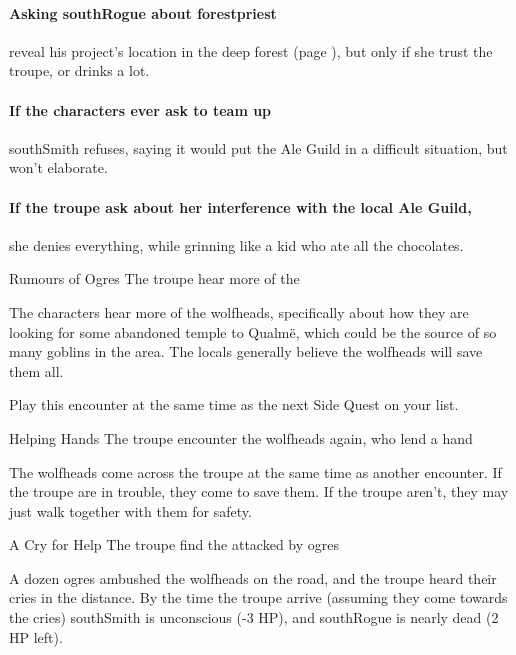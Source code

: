 \southRogue
\label{courtbile}

\paragraph{Asking \gls{southRogue} about \gls{forestpriest}}
reveal his project's location in the deep forest (page \pageref{lostcity}), but only if she trust the troupe, or drinks a lot.

\southSmith

\paragraph{If the characters ever ask to team up}
\gls{southSmith} refuses, saying it would put the Ale Guild in a difficult situation, but won't elaborate.

\southSeeker

\beardedalemaster
\label{beardedalemaster}

\paragraph{If the troupe ask about her interference with the local Ale Guild,}
she denies everything, while grinning like a kid who ate all the chocolates.

{\squash Rumours of Ogres}%
{The troupe hear more of the }%

The characters hear more of the \glspl{wolfhead}, specifically about how they are looking for some abandoned temple to Qualm\"e, which could be the source of so many goblins in the area.
The locals generally believe the \glspl{wolfhead} will save them all.

Play this encounter at the same time as the next Side Quest on your list.

{\squash Helping Hands}%
{The troupe encounter the \glspl{wolfhead} again, who lend a hand}%

The \glspl{wolfhead} come across the troupe at the same time as another encounter.
If the troupe are in trouble, they come to save them.
If the troupe aren't, they may just walk together with them for safety.

{A Cry for Help}%
{The troupe find the  attacked by ogres}%

A dozen ogres ambushed the \glspl{wolfhead} on the road, and the troupe heard their cries in the distance.
By the time the troupe arrive (assuming they come towards the cries) \gls{southSmith} is unconscious (-3 HP), and \gls{southRogue} is nearly dead (2 HP left).

